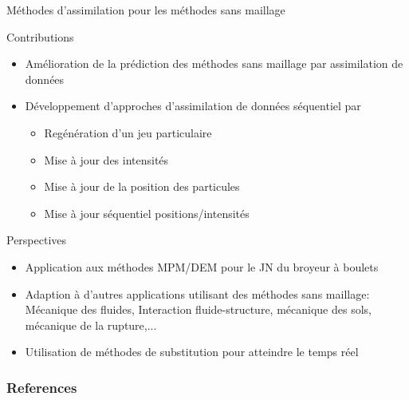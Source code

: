 \documentclass[aspectratio=169]{beamer} %
\begin{document}
\begin{frame}{Méthodes d'assimilation pour les méthodes sans maillage}

    \begin{block}{Contributions}
        \begin{itemize}
            \item Amélioration de la prédiction des méthodes sans maillage par assimilation de données
            \item Développement d'approches d'assimilation de données séquentiel par
                  \begin{itemize}
                      \item Regénération d'un jeu particulaire
                      \item Mise à jour des intensités
                      \item Mise à jour de la position des particules
                      \item Mise à jour séquentiel positions/intensités
                  \end{itemize}
        \end{itemize}
    \end{block}

    \begin{block}{Perspectives}
        \begin{itemize}
            \item Application aux méthodes MPM/DEM pour le JN du broyeur à boulets
            \item Adaption à d'autres applications utilisant des méthodes sans maillage: Mécanique des fluides, Interaction fluide-structure, mécanique des sols, mécanique de la rupture,...
            \item Utilisation de méthodes de substitution pour atteindre le temps réel
        \end{itemize}
    \end{block}
\end{frame}

\closingframe

\begin{frame}
    \frametitle{References}
    \printbibliography %
\end{frame}
\end{document}

